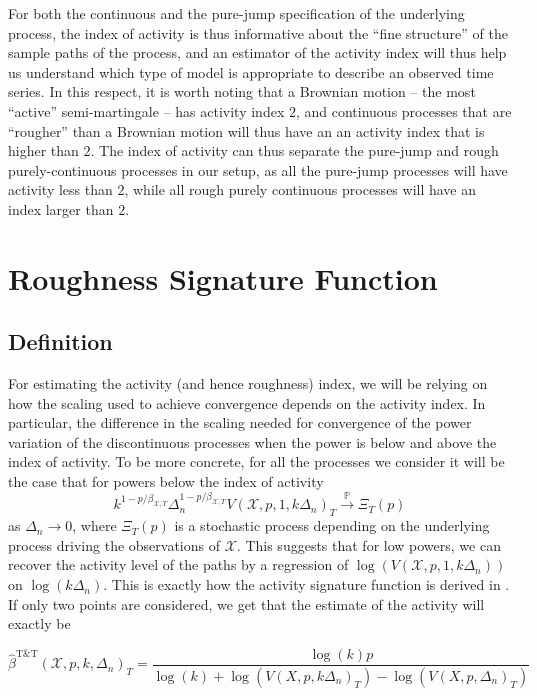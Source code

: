 \documentclass[fleqn,11pt,letterpaper]{article}
\theoremstyle{plain}
\theoremstyle{definition}
\theoremstyle{remark}
\numberwithin{equation}{section}
\begin{document}
For both the continuous and the pure-jump specification of the underlying process, the index of activity is thus informative about the ``fine structure'' of the sample paths of the process, and an estimator of the activity index will thus help us understand which type of model is appropriate to describe an observed time series. In this respect, it is worth noting that a Brownian motion -- the most ``active'' semi-martingale -- has activity index $2$, and continuous processes that are ``rougher'' than a Brownian motion will thus have an an activity index that is higher than $2$. The index of activity can thus separate the pure-jump and rough purely-continuous processes in our setup, as all the pure-jump processes will have activity less than $2$, while all rough purely continuous processes will have an index larger than $2$. 

\section{Roughness Signature Function}\label{sec:ASF}
\subsection{Definition}
For estimating the activity (and hence roughness) index, we will be relying on how the scaling used to achieve convergence depends on the activity index. In particular, the difference in the scaling needed for convergence of the power variation of the discontinuous processes when the power is below and above the index of activity. To be more concrete, for all the processes we consider it will be the case that for powers below the index of activity
\begin{equation}
    k^{1-p/\beta_{\mathcal{X},T}}\Delta_n^{1-p/\beta_{\mathcal{X},T}}V(\mathcal{X},p,1,k\Delta_n)_T\overset{\mathbb{P}}{\longrightarrow}\Xi_T(p)
\end{equation}
as $\Delta_n\to0$, where $\Xi_T(p)$ is a stochastic process depending on the underlying process driving the observations of $\mathcal{X}$. This suggests that for low powers, we can recover the activity level of the paths by a regression of $\log(V(\mathcal{X},p,1,k\Delta_n))$ on $\log(k\Delta_n)$. This is exactly how the activity signature function is derived in \cite{Todorov2010}. If only two points are considered, we get that the estimate of the activity will exactly be 

\begin{equation}\label{eq:def_asf_TT}
    \hat{\beta}^{\text{T\&T}}(\mathcal{X},p,k,\Delta_n)_T = \frac{\log(k)p}{\log(k)+\log(V(X,p,k\Delta_n)_T)-\log(V(X,p,\Delta_n)_T)}
\end{equation}
\end{document}
